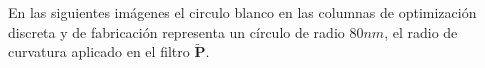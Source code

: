 En las siguientes imágenes el circulo blanco en las columnas de optimización discreta y de fabricación
representa un círculo de radio $80nm$, el radio de curvatura aplicado en el filtro 
$\widetilde{\boldsymbol{P}}$.





